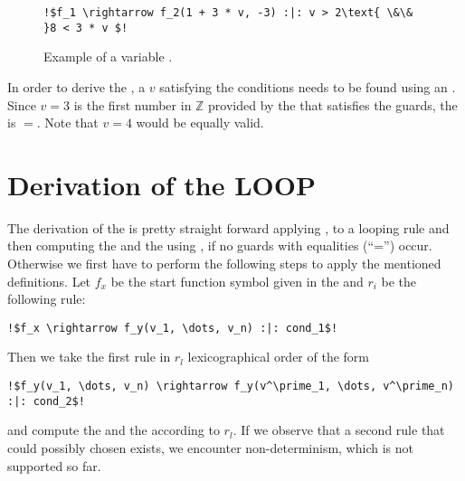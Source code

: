 \newsavebox{\stemextwo}%
\newsavebox{\stemextwosecond}%
\begin{figure}[H]
	\begin{lstlisting}[escapechar=!]
	!$f_1 \rightarrow f_2(1 + 3 * v, -3) :|: v > 2\text{ \&\& }8 < 3 * v $!
	\end{lstlisting}	
	\caption{Example of a variable \stem.}
	\label{lst:stem-var}
\end{figure}
In order to derive the \stem, a $v$ satisfying the conditions needs to be found using an \solver. Since $v=3$ is the first number in $\mathbb{Z}$ provided by the \solver that satisfies the guards, the \stem is \usebox{\stemextwo}$=$\usebox{\stemextwosecond}. Note that $v=4$ would be equally valid.

\section{Derivation of the LOOP}
\label{sec:loop}
The derivation of the \loopt is pretty straight forward applying ,  to a looping rule and then computing the \iterationmatrix and the \iterationconstants using , if no guards with equalities (``='') occur. Otherwise we first have to perform the following steps to apply the mentioned definitions. \newline
Let $f_x$ be the start function symbol given in the \its and $r_i$ be the following rule:
\begin{lstlisting}[escapechar=!]
	!$f_x \rightarrow f_y(v_1, \dots, v_n) :|: cond_1$!
\end{lstlisting} 
Then we take the first rule in $r_l$ lexicographical order of the form 
\begin{lstlisting}[escapechar=!]
	!$f_y(v_1, \dots, v_n) \rightarrow f_y(v^\prime_1, \dots, v^\prime_n) :|: cond_2$!
\end{lstlisting}
and compute the \iterationmatrix and the \iterationconstants according to $r_l$. 
If we observe that a second rule that could possibly chosen exists, we encounter non-determinism, which is not supported so far.

